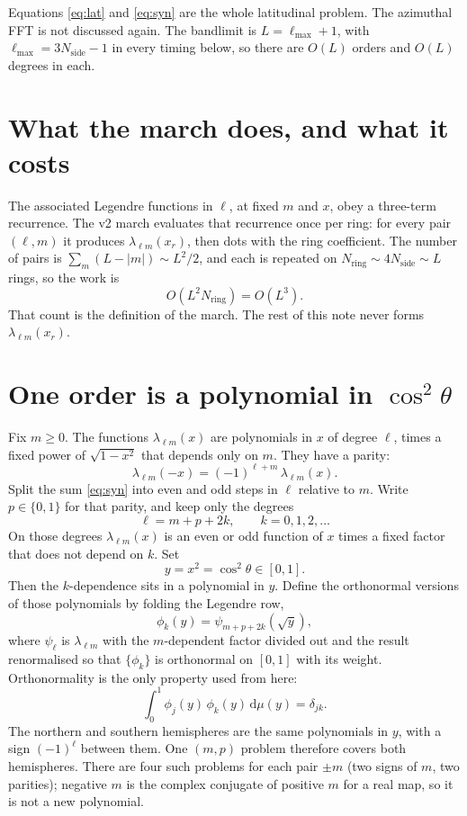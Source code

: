 \documentclass[11pt,a4paper]{article}
\numberwithin{equation}{section}
\begin{document}
Equations \eqref{eq:lat} and \eqref{eq:syn} are the whole latitudinal problem.
The azimuthal FFT is not discussed again. The bandlimit is $L=\ell_{\max}+1$,
with $\ell_{\max}=3N_{\mathrm{side}}-1$ in every timing below, so there are
$O(L)$ orders and $O(L)$ degrees in each.

\section{What the march does, and what it costs}
\label{sec:march}

The associated Legendre functions in $\ell$, at fixed $m$ and $x$, obey a three-term
recurrence. The v2 march evaluates that recurrence once per ring: for every pair
$(\ell,m)$ it produces $\lambda_{\ell m}(x_r)$, then dots with the ring coefficient.
The number of pairs is $\sum_m (L-|m|)\sim L^2/2$, and each is repeated on
$N_{\mathrm{ring}}\sim 4N_{\mathrm{side}}\sim L$ rings, so the work is
\[
  O(L^2 N_{\mathrm{ring}})=O(L^3).
\]
That count is the definition of the march. The rest of this note never forms
$\lambda_{\ell m}(x_r)$.

\section{One order is a polynomial in \texorpdfstring{$\cos^2\theta$}{cos squared theta}}
\label{sec:fold}

Fix $m\ge 0$. The functions $\lambda_{\ell m}(x)$ are polynomials in $x$ of degree $\ell$,
times a fixed power of $\sqrt{1-x^2}$ that depends only on $m$. They have a parity:
\[
  \lambda_{\ell m}(-x) = (-1)^{\ell+m}\,\lambda_{\ell m}(x).
\]
Split the sum \eqref{eq:syn} into even and odd steps in $\ell$ relative to $m$.
Write $p\in\{0,1\}$ for that parity, and keep only the degrees
\[
  \ell = m+p+2k, \qquad k=0,1,2,\dots
\]
On those degrees $\lambda_{\ell m}(x)$ is an even or odd function of $x$ times a fixed
factor that does not depend on $k$. Set
\[
  y = x^2 = \cos^2\theta \in [0,1].
\]
Then the $k$-dependence sits in a polynomial in $y$. Define the orthonormal versions of
those polynomials by folding the Legendre row,
\begin{equation}
  \phi_k(y) = \psi_{m+p+2k}(\sqrt{y}),
  \label{eq:phi}
\end{equation}
where $\psi_\ell$ is $\lambda_{\ell m}$ with the $m$-dependent factor divided out and the
result renormalised so that $\{\phi_k\}$ is orthonormal on $[0,1]$ with its weight.
Orthonormality is the only property used from here:
\begin{equation}
  \int_0^1 \phi_j(y)\,\phi_k(y)\,\mathrm{d}\mu(y) = \delta_{jk}.
  \label{eq:on}
\end{equation}
The northern and southern hemispheres are the same polynomials in $y$, with a sign
$(-1)^{\ell}$ between them. One $(m,p)$ problem therefore covers both hemispheres.
There are four such problems for each pair $\pm m$ (two signs of $m$, two parities);
negative $m$ is the complex conjugate of positive $m$ for a real map, so it is not a
new polynomial.
\end{document}
